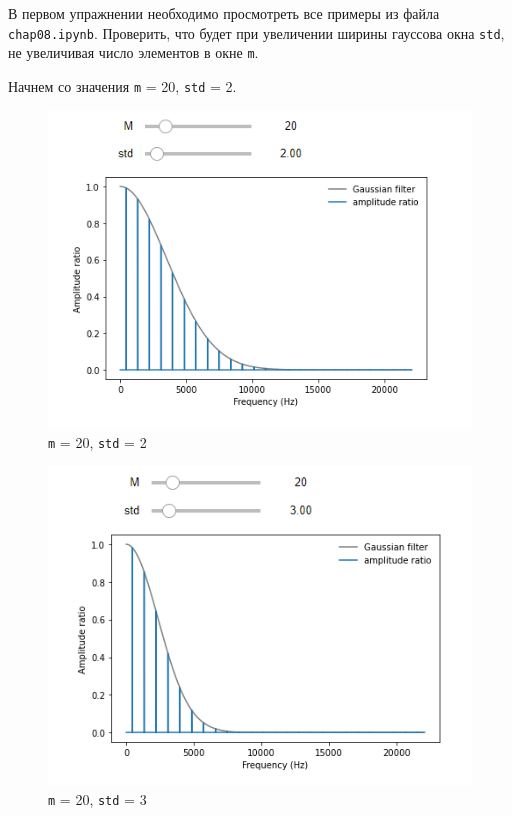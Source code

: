 \documentclass[a4paper, 14pt]{extarticle}
\begin{document}
    В первом упражнении необходимо просмотреть все примеры из файла \texttt{chap08.ipynb}.
    Проверить, что будет при увеличении ширины гауссова окна \texttt{std}, не увеличивая число элементов в окне \texttt{m}.

    Начнем со значения \texttt{m} = 20, \texttt{std} = 2.

    \begin{figure}[H]
        \centering
        \includegraphics[width=0.8\linewidth]{gauss_20_2}
        \caption{\texttt{m} = 20, \texttt{std} = 2}
        \label{fig:gauss_20_2}
    \end{figure}

    \begin{figure}[H]
        \centering
        \includegraphics[width=0.8\linewidth]{gauss_20_3}
        \caption{\texttt{m} = 20, \texttt{std} = 3}
        \label{fig:gauss_20_3}
    \end{figure}
\end{document}
